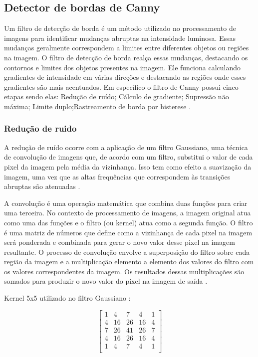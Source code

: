\subsection[Detector de bordas de Canny]{Detector de bordas de Canny}\label{sec:Detector de bordas de Canny}

Um filtro de detecção de borda é um método utilizado no processamento de imagens para identificar mudanças abruptas na intensidade luminosa. Essas mudanças geralmente correspondem a limites entre diferentes objetos ou regiões na imagem. O filtro de detecção de borda realça essas mudanças, destacando os contornos e limites dos objetos presentes na imagem. Ele funciona calculando gradientes de intensidade em várias direções e destacando as regiões onde esses gradientes são mais acentuados. Em específico o filtro de Canny possui cinco etapas sendo elas: Redução de ruído; Cálculo de gradiente; Supressão não máxima; Limite duplo;Rastreamento de borda por histerese \cite{canny-edge-detection-python}.


\subsubsection[Redução de ruido]{Redução de ruido}
A redução de ruído ocorre com a aplicação de um filtro Gaussiano, uma técnica de convolução de imagens que, de acordo com um filtro, substitui o valor de cada pixel da imagem pela média da vizinhança. Isso tem como efeito a suavização da imagem, uma vez que as altas frequências que correspondem às transições abruptas são atenuadas \cite{filtroGaus}.

A convolução é uma operação matemática que combina duas funções para criar uma terceira. No contexto de processamento de imagens, a imagem original atua como uma das funções e o filtro (ou kernel) atua como a segunda função. O filtro é uma matriz de números que define como a vizinhança de cada pixel na imagem será ponderada e combinada para gerar o novo valor desse pixel na imagem resultante. O processo de convolução envolve a superposição do filtro sobre cada região da imagem e a multiplicação elemento a elemento dos valores do filtro com os valores correspondentes da imagem. Os resultados dessas multiplicações são somados para produzir o novo valor do pixel na imagem de saída \cite{convolucao}.

Kernel 5x5 utilizado no filtro Gaussiano \cite{kernel_gaus}:

\[
    \begin{bmatrix}
        1 & 4 & 7 & 4 & 1 \\
        4 & 16 & 26 & 16 & 4 \\
        7 & 26 & 41 & 26 & 7 \\
        4 & 16 & 26 & 16 & 4 \\
        1 & 4 & 7 & 4 & 1 \\
    \end{bmatrix}
\]

